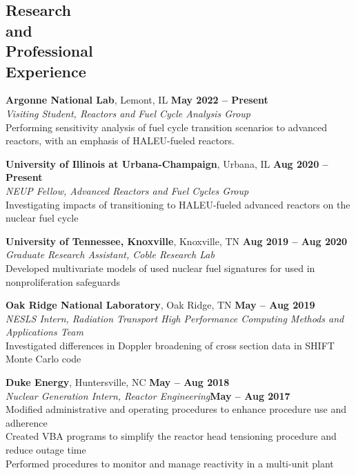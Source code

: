 \documentclass[margin,line]{resume}
\begin{document}
\begin{resume}
    \section{\mysidestyle Research\\and\\Professional\\Experience}
    \textbf{Argonne National Lab}, Lemont, IL \hfill \textbf{May 2022 -- Present}\\
                \textsl{Visiting Student, Reactors and Fuel Cycle Analysis Group} \\
                Performing sensitivity analysis of fuel cycle transition scenarios to 
                advanced reactors, with an emphasis of HALEU-fueled reactors.

    \textbf{University of Illinois at Urbana-Champaign}, Urbana, IL \hfill \textbf{Aug 2020 -- Present} \\
                \textsl{NEUP Fellow, Advanced Reactors and Fuel Cycles Group} \\
                Investigating impacts of transitioning to HALEU-fueled advanced 
                reactors on the nuclear fuel cycle

    \textbf{University of Tennessee, Knoxville}, Knoxville, TN \hfill \textbf{Aug 2019 -- Aug 2020}\\
                \textsl{Graduate Research Assistant, Coble Research Lab} \\ 
                Developed multivariate models of used nuclear fuel signatures for 
                used in nonproliferation safeguards 

    \textbf{Oak Ridge National Laboratory}, Oak Ridge, TN \hfill \textbf{May -- Aug 2019}\\
                \textsl{NESLS Intern, Radiation Transport High Performance Computing Methods and Applications Team}\\
                Investigated differences in Doppler broadening of cross section data in SHIFT Monte Carlo code

    \textbf{Duke Energy}, Huntersville, NC \hfill \textbf{May -- Aug 2018}\\
                \textsl{Nuclear Generation Intern, Reactor Engineering}\hfill \textbf{May -- Aug 2017}\\
                Modified administrative and operating procedures to enhance procedure use and adherence \\
                Created VBA programs to simplify the reactor head tensioning procedure and reduce outage time \\
                Performed procedures to monitor and manage reactivity in a multi-unit plant 


\end{resume}
\end{document}
